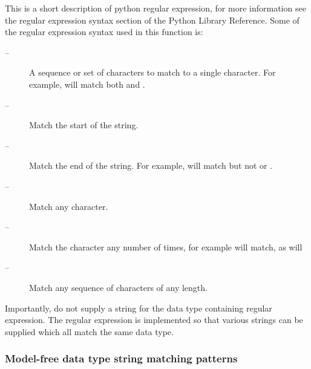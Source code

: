  This is a short description of python regular expression, for more information see the regular expression syntax section of the Python Library Reference.  Some of the regular expression syntax used in this function is: 
  

 \begin{description} 
 \item[\quotecmd{[]} --]  A sequence or set of characters to match to a single character.  For example,  will match both  and .  
 \item[\quotecmd{\^{}} --]  Match the start of the string.  
 \item[\quotecmd{\$} --]  Match the end of the string.  For example,  will match  but not  or .  
 \item[ --]  Match any character.  
 \item[ --]  Match the character  any number of times, for example  will match, as will   
 \item[ --]  Match any sequence of characters of any length.  
 \end{description} 
  

 Importantly, do not supply a string for the data type containing regular expression.  The regular expression is implemented so that various strings can be supplied which all match the same data type. 
  

  
 \subsubsection{Model-free data type string matching patterns} 

